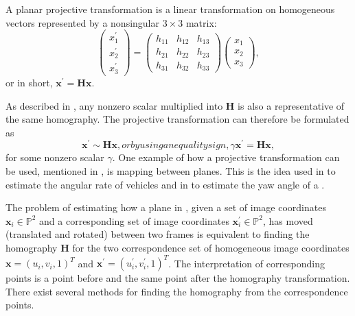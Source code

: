 \begin{definition} \label{def:projtrans}
	A planar projective transformation is a linear transformation on homogeneous  vectors represented by a nonsingular $3 \times 3$ matrix:
	\begin{equation}
		\begin{pmatrix} x^\prime_1 \\ x^\prime_2 \\ x^\prime_3 \end{pmatrix}
		=
		\begin{pmatrix}
			h_{11} & h_{12} & h_{13} \\
			h_{21} & h_{22} & h_{23} \\
			h_{31} & h_{32} & h_{33}
		\end{pmatrix}
		\begin{pmatrix} x_1 \\ x_2 \\ x_3 \end{pmatrix},
	\end{equation}
	or in short, $\bm{x}^\prime = \bm{H} \bm{x}$.
\end{definition}
%
As described in \cite{Nordberg:2015}, any nonzero scalar multiplied into $\bm{H}$ is also a representative of the same homography.
The projective transformation can therefore be formulated as
%
\begin{subequations}
\begin{equation}
	\label{eq:homography}
	\bm{x}^\prime \sim \bm{H} \bm{x},
\end{equation}
%
or by using an equality sign,
%
\begin{equation}
	\label{eq:homographyequality}
	\gamma \bm{x}^\prime = \bm{H} \bm{x},
\end{equation}
\end{subequations}
%
for some nonzero scalar $\gamma$.
One example of how a projective transformation can be used, mentioned in \cite{Hartley:2004}, is mapping between planes. 
This is the idea used in \cite{Gabb:2013} to estimate the angular rate of vehicles and in \cite{Mondragon:2010} to estimate the yaw angle of a \abbrUAV.

The problem of estimating how a plane in , given a set of image coordinates $\bm{x}_i \in \mathbb{P}^2$ and a corresponding set of image coordinates $\bm{x}^\prime_i \in \mathbb{P}^2$, has moved (translated and rotated) between two frames is equivalent to finding the homography $\bm{H}$ for the two correspondence set of homogeneous image coordinates $\bm{x} = (u_i, v_i, 1)^T$ and $\bm{x}^\prime = (u^\prime_i, v^\prime_i, 1)^T$.
The interpretation of corresponding points is a point before and the same point after the homography transformation.
There exist several methods for finding the homography from the correspondence points.

